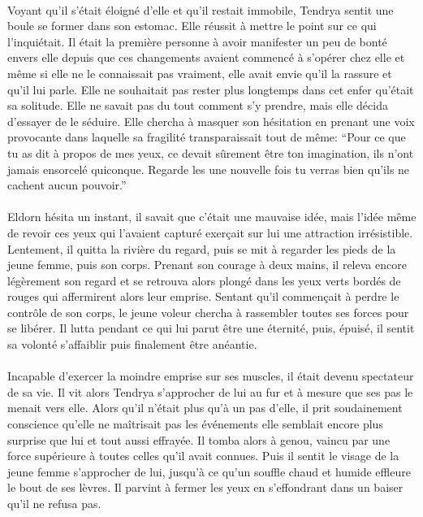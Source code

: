 \paragraph{}
Voyant qu'il s'était éloigné d'elle et qu'il restait immobile, Tendrya sentit
une boule se former dans son estomac. Elle réussit à mettre le point sur ce
qui l'inquiétait. Il était la première personne à avoir manifester un peu de
bonté envers elle depuis que ces changements avaient commencé à s'opérer chez
elle et même si elle ne le connaissait pas vraiment, elle avait envie qu'il la
rassure et qu'il lui parle. Elle ne souhaitait pas rester plus longtemps dans
cet enfer qu'était sa solitude. Elle ne savait pas du tout comment s'y
prendre, mais elle décida d'essayer de le séduire. Elle chercha à masquer son
hésitation en prenant une voix provocante dans laquelle sa fragilité
transparaissait tout de même: ``Pour ce que tu as dit à propos de mes yeux,
ce devait sûrement être ton imagination, ils n'ont jamais ensorcelé quiconque.
Regarde les une nouvelle fois tu verras bien qu'ils ne cachent aucun
pouvoir.''

\paragraph{}
Eldorn hésita un instant, il savait que c'était une mauvaise idée, mais l'idée
même de revoir ces yeux qui l'avaient capturé exerçait sur lui une attraction
irrésistible. Lentement, il quitta la rivière du regard, puis se mit à
regarder les pieds de la jeune femme, puis son corps.  Prenant
son courage à deux mains, il releva encore légèrement son regard et se
retrouva alors plongé dans les yeux verts bordés de rouges qui affermirent
alors leur emprise. Sentant qu'il commençait à perdre le contrôle de son
corps, le jeune voleur chercha à rassembler toutes ses forces pour se libérer.
Il lutta pendant ce qui lui parut être une éternité, puis, épuisé, il sentit
sa volonté s'affaiblir puis finalement être anéantie.

\paragraph{}
Incapable d'exercer la moindre emprise sur ses muscles, il était devenu
spectateur de sa vie. Il vit alors Tendrya s'approcher de lui au fur et à
mesure que ses pas le menait vers elle. Alors qu'il n'était plus qu'à un pas
d'elle, il prit soudainement conscience qu'elle ne maîtrisait pas les
événements elle semblait encore plus surprise que lui et tout aussi effrayée.
Il tomba alors à genou, vaincu par une force supérieure à toutes celles qu'il
avait connues. Puis il sentit le visage de la jeune femme s'approcher de lui,
jusqu'à ce qu'un souffle chaud et humide effleure le bout de ses lèvres. Il
parvint à fermer les yeux en s'effondrant dans un baiser qu'il ne refusa pas.

